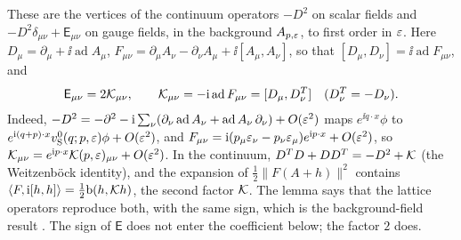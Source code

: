 These are the vertices of the continuum operators $-D^2$ on scalar fields and $-D^2\delta_{\mu\nu}+\mathsf E_{\mu\nu}$ on gauge fields, in the background $A_{p,\varepsilon}$, to first order in $\varepsilon$. Here $D_\mu=\partial_\mu+\ii\operatorname{ad}A_\mu$, $F_{\mu\nu}=\partial_\mu A_\nu-\partial_\nu A_\mu+\ii[A_\mu,A_\nu]$, so that $[D_\mu,D_\nu]=\ii\operatorname{ad}F_{\mu\nu}$, and
\[
\mathsf E_{\mu\nu}=2\mathcal K_{\mu\nu},\qquad\mathcal K_{\mu\nu}=-\mathrm i\operatorname{ad}F_{\mu\nu}=[D_\mu,D_\nu^T]\quad(D_\nu^T=-D_\nu).
\]
Indeed, $-D^2=-\partial^2-\mathrm i\sum_\nu(\partial_\nu\operatorname{ad}A_\nu+\operatorname{ad}A_\nu\,\partial_\nu)+O(\varepsilon^2)$ maps $e^{\ii q\cdot x}\phi$ to $e^{\mathrm i(q+p)\cdot x}v^0_{\rm S}(q;p,\varepsilon)\phi+O(\varepsilon^2)$, and $F_{\mu\nu}=\mathrm i(p_\mu\varepsilon_\nu-p_\nu\varepsilon_\mu)e^{\mathrm i p\cdot x}+O(\varepsilon^2)$, so $\mathcal K_{\mu\nu}=e^{\mathrm i p\cdot x}\mathcal K(p,\varepsilon)_{\mu\nu}+O(\varepsilon^2)$. In the continuum, $D^TD+DD^T=-D^2+\mathcal K$ (the Weitzenb\"ock identity), and the expansion of $\frac12\|F(A+h)\|^2$ contains $\langle F,\mathrm i[h,h]\rangle=\frac12\mathrm b(h,\mathcal K h)$, the second factor $\mathcal K$. The lemma says that the lattice operators reproduce both, with the same sign, which is the background-field result \cite{LuscherWeisz}. The sign of $\mathsf E$ does not enter the coefficient below; the factor $2$ does.

